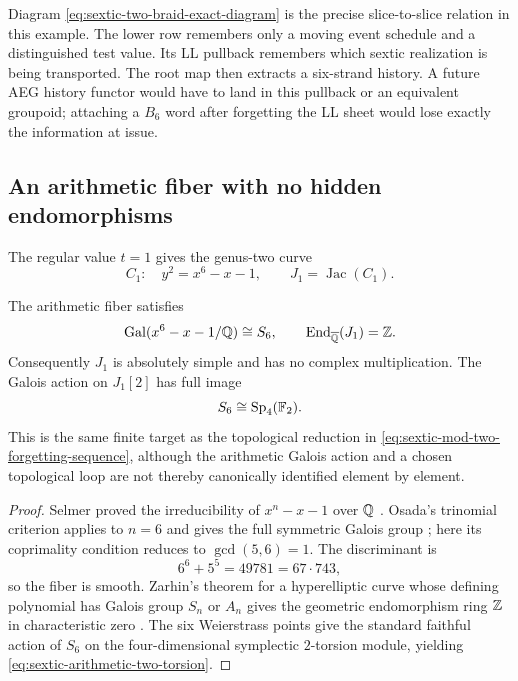 Diagram \eqref{eq:sextic-two-braid-exact-diagram} is the precise
slice-to-slice relation in this example.  The lower row remembers only a moving
event schedule and a distinguished test value.  Its LL pullback remembers
which sextic realization is being transported.  The root map then extracts a
six-strand history.  A future AEG history functor would have to land in this
pullback or an equivalent groupoid; attaching a $B_6$ word after forgetting the
LL sheet would lose exactly the information at issue.

\subsection{An arithmetic fiber with no hidden endomorphisms}

The regular value $t=1$ gives the genus-two curve
\begin{equation}
 C_1:\quad y^2=x^6-x-1,
 \qquad
 J_1=\operatorname{Jac}(C_1).
 \label{eq:sextic-arithmetic-fiber}
\end{equation}

\begin{proposition}
\label{prop:sextic-arithmetic-maximality}
The arithmetic fiber satisfies
\begin{equation}
 \operatorname{Gal}(x^6-x-1/\mathbb{Q})\cong S_6,
 \qquad
 \operatorname{End}_{\overline{\mathbb{Q}}}(J_1)=\mathbb{Z}.
 \label{eq:sextic-galois-endomorphism}
\end{equation}
Consequently $J_1$ is absolutely simple and has no complex multiplication.
The Galois action on $J_1[2]$ has full image
\begin{equation}
 S_6\cong\operatorname{Sp}_4(\mathbb{F}_2).
 \label{eq:sextic-arithmetic-two-torsion}
\end{equation}
This is the same finite target as the topological reduction in
\eqref{eq:sextic-mod-two-forgetting-sequence}, although the arithmetic Galois
action and a chosen topological loop are not thereby canonically identified
element by element.
\end{proposition}

\begin{proof}
Selmer proved the irreducibility of $x^n-x-1$ over $\mathbb{Q}$
\cite{Selmer1956IrreducibleTrinomials}.  Osada's trinomial criterion applies
to $n=6$ and gives the full symmetric Galois group
\cite{Osada1987GaloisTrinomials}; here its coprimality condition reduces to
$\gcd(5,6)=1$.  The discriminant is
\begin{equation}
 6^6+5^5=49781=67\cdot743,
 \label{eq:sextic-arithmetic-discriminant}
\end{equation}
so the fiber is smooth.  Zarhin's theorem for a hyperelliptic curve whose
defining polynomial has Galois group $S_n$ or $A_n$ gives the geometric
endomorphism ring $\mathbb{Z}$ in characteristic zero
\cite{Zarhin2000HyperellipticJacobians}.  The six Weierstrass points give the
standard faithful action of $S_6$ on the four-dimensional symplectic
$2$-torsion module, yielding \eqref{eq:sextic-arithmetic-two-torsion}.
\end{proof}

